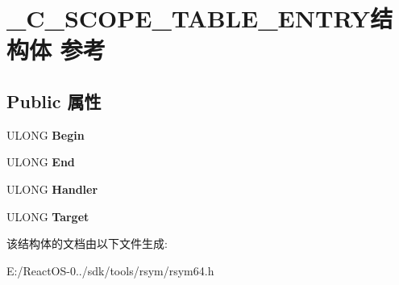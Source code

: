 \hypertarget{struct___c___s_c_o_p_e___t_a_b_l_e___e_n_t_r_y}{}\section{\+\_\+\+C\+\_\+\+S\+C\+O\+P\+E\+\_\+\+T\+A\+B\+L\+E\+\_\+\+E\+N\+T\+R\+Y结构体 参考}
\label{struct___c___s_c_o_p_e___t_a_b_l_e___e_n_t_r_y}
\subsection*{Public 属性}
\begin{DoxyCompactItemize}
\item 
\mbox{\label{struct___c___s_c_o_p_e___t_a_b_l_e___e_n_t_r_y_a382219f6e240d95ba0701167a080c94e}} 
U\+L\+O\+NG {\bfseries Begin}
\item 
\mbox{\label{struct___c___s_c_o_p_e___t_a_b_l_e___e_n_t_r_y_ace61f3fb062b6a5e1ce2a4063c204d42}} 
U\+L\+O\+NG {\bfseries End}
\item 
\mbox{\label{struct___c___s_c_o_p_e___t_a_b_l_e___e_n_t_r_y_a367e250416db1a40b8baaf45529d1745}} 
U\+L\+O\+NG {\bfseries Handler}
\item 
\mbox{\label{struct___c___s_c_o_p_e___t_a_b_l_e___e_n_t_r_y_a258f61824478d939ef6515b249b5a760}} 
U\+L\+O\+NG {\bfseries Target}
\end{DoxyCompactItemize}


该结构体的文档由以下文件生成\+:\begin{DoxyCompactItemize}
\item 
E\+:/\+React\+O\+S-\/0../sdk/tools/rsym/rsym64.\+h\end{DoxyCompactItemize}
